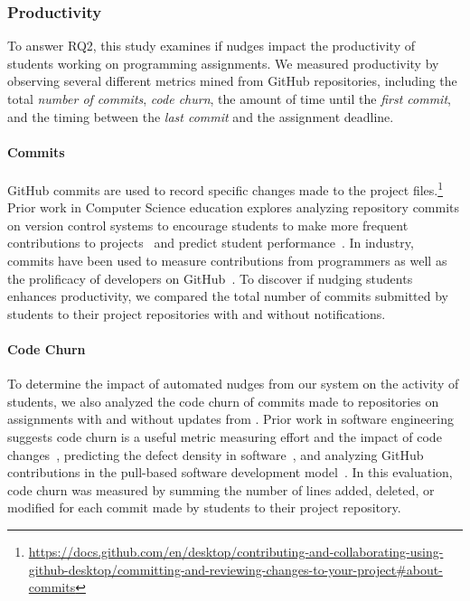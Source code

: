 \subsubsection{Productivity}

To answer RQ2, this study examines if nudges impact the productivity of students working on programming assignments.
We measured productivity by observing several different metrics mined from GitHub repositories, including the total \textit{number of commits}, \textit{code churn}, the amount of time until the \textit{first commit}, and the timing
between the \textit{last commit} and the assignment deadline.

\paragraph*{Commits}

GitHub commits are used to record specific changes
made to the project files.\footnote{\url{https://docs.github.com/en/desktop/contributing-and-collaborating-using-github-desktop/committing-and-reviewing-changes-to-your-project\#about-commits}} Prior work in Computer Science education explores analyzing repository commits on version control systems to encourage students to make more frequent contributions to projects~\cite{Singer12Race} and predict student performance~\cite{sprint2019mining}. In industry, commits have been used to measure contributions from programmers as well as the prolificacy of developers on GitHub~\cite{Vasilescu2016Multitask}. To discover if nudging students enhances productivity, we compared the total number of commits submitted by students to their project repositories with and without \tooltwo notifications.

\paragraph*{Code Churn}

To determine the impact of automated nudges from
our system on the activity of students, we also analyzed the code churn of commits made to repositories on assignments with and without updates from \tooltwo. Prior work in software engineering suggests code churn is a useful metric measuring effort and the impact of code changes~\cite{Munson98Churn}, predicting the defect density in software~\cite{nagappan2005DefectDensity}, and analyzing GitHub contributions in the pull-based software development model~\cite{gousios2014dataset}. In this evaluation, code churn was measured by summing the number of lines added, deleted, or modified for each commit made by students to their project repository.

